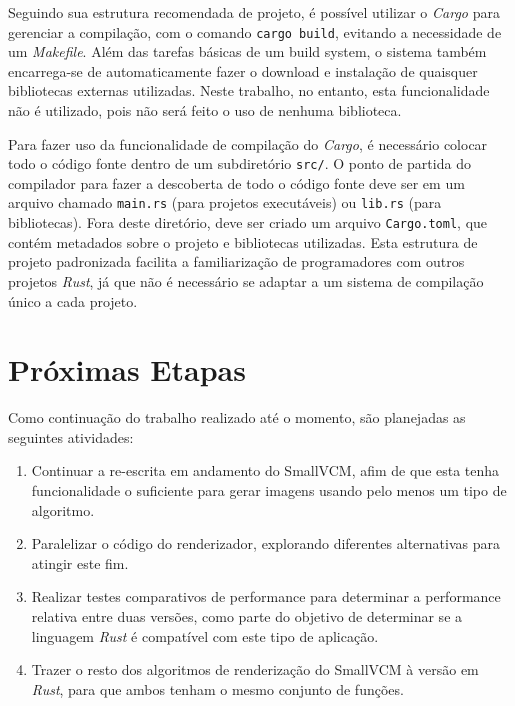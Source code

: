 \documentclass[tg]{mdtufsm}
\begin{document}
Seguindo sua estrutura recomendada de projeto, é possível utilizar o \emph{Cargo} para gerenciar a compilação, com o comando \texttt{cargo build}, evitando a necessidade de um \emph{Makefile}. Além das tarefas básicas de um build system, o sistema também encarrega-se de automaticamente fazer o download e instalação de quaisquer bibliotecas externas utilizadas. Neste trabalho, no entanto, esta funcionalidade não é utilizado, pois não será feito o uso de nenhuma biblioteca.

Para fazer uso da funcionalidade de compilação do \emph{Cargo}, é necessário colocar todo o código fonte dentro de um subdiretório \texttt{src/}. O ponto de partida do compilador para fazer a descoberta de todo o código fonte deve ser em um arquivo chamado \texttt{main.rs} (para projetos executáveis) ou \texttt{lib.rs} (para bibliotecas). Fora deste diretório, deve ser criado um arquivo \texttt{Cargo.toml}, que contém metadados sobre o projeto e bibliotecas utilizadas. Esta estrutura de projeto padronizada facilita a familiarização de programadores com outros projetos \emph{Rust}, já que não é necessário se adaptar a um sistema de compilação único a cada projeto.

\chapter{Próximas Etapas}

Como continuação do trabalho realizado até o momento, são planejadas as seguintes atividades:

\begin{enumerate}
	\item Continuar a re-escrita em andamento do SmallVCM, afim de que esta tenha funcionalidade o suficiente para gerar imagens usando pelo menos um tipo de algoritmo.
	\item Paralelizar o código do renderizador, explorando diferentes alternativas para atingir este fim.
	\item Realizar testes comparativos de performance para determinar a performance relativa entre duas versões, como parte do objetivo de determinar se a linguagem \emph{Rust} é compatível com este tipo de aplicação.
	\item Trazer o resto dos algoritmos de renderização do SmallVCM à versão em \emph{Rust}, para que ambos tenham o mesmo conjunto de funções.
\end{enumerate}

\setlength{\baselineskip}{\baselineskip}


\end{document}
